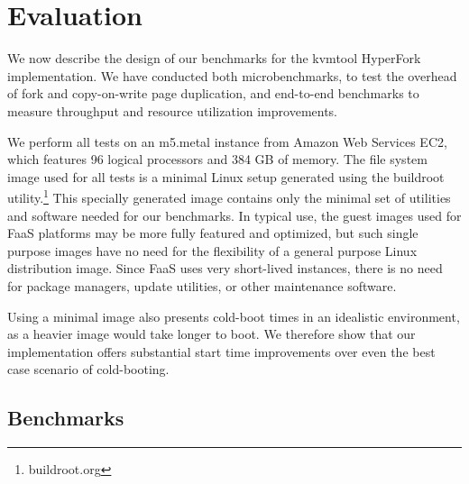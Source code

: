 \section{Evaluation} \label{sec:experiments} We now describe the
design of our benchmarks for the kvmtool HyperFork implementation. We have
conducted both microbenchmarks, to test the overhead of fork and copy-on-write
page duplication, and end-to-end benchmarks to measure throughput and resource
utilization improvements.

We perform all tests on an m5.metal instance from Amazon Web Services EC2,
which features 96 logical processors and 384 GB of memory. The file system
image used for all tests is a minimal Linux setup generated using the buildroot
utility.\footnote{buildroot.org} This specially generated image contains only
the minimal set of utilities and software needed for our benchmarks. In typical
use, the guest images used for FaaS platforms may be more fully featured and
optimized, but such single purpose images have no need for the flexibility of a
general purpose Linux distribution image. Since FaaS uses very short-lived
instances, there is no need for package managers, update utilities, or other
maintenance software.

Using a minimal image also presents cold-boot times in an idealistic
environment, as a heavier image would take longer to boot. We therefore show
that our implementation offers substantial start time improvements over even
the best case scenario of cold-booting.

\subsection{Benchmarks}

